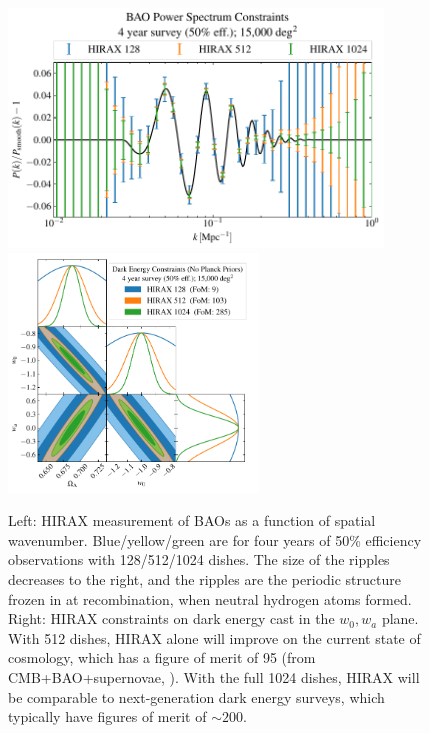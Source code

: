 \documentclass[11pt]{article}
\begin{document}
\begin{figure}[t]
  \includegraphics[height=2.5in]{hirax_bao_ps.pdf}
  \includegraphics[height=2.5in]{hirax_de_constraints.pdf}
\caption{\small Left: HIRAX measurement of BAOs as a function of
  spatial wavenumber.  Blue/yellow/green are for four years of 50\%
  efficiency observations with 128/512/1024 dishes.  The size of the
  ripples decreases to the right, and the ripples are the periodic
  structure frozen in at recombination, when neutral hydrogen atoms
  formed.  Right: HIRAX constraints on dark energy cast in the
  $w_0,w_a$ plane.  With 512 dishes, HIRAX alone will improve on the
  current state of cosmology, which has a figure of merit of 95 (from
  CMB+BAO+supernovae, \citet{Planck2018Params}).  With the full 1024
  dishes, HIRAX will be comparable to next-generation dark energy
  surveys, which typically have figures of merit of $\sim 200$.
  \label{fig:hirax_de}
}
\end{figure}
\end{document}
